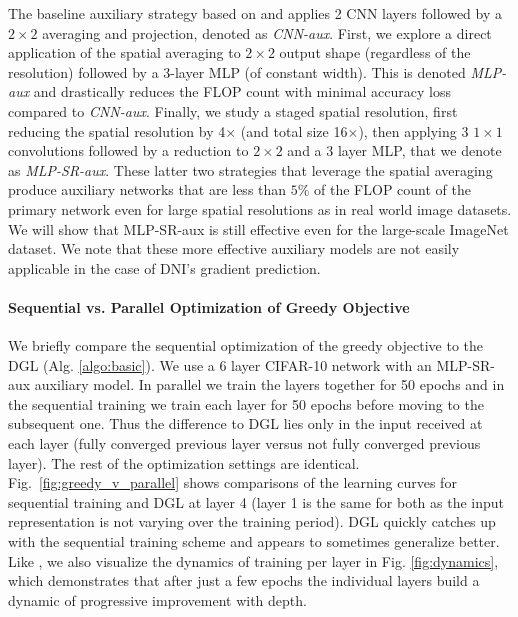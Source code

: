 \documentclass{article}
\begin{document}
The baseline auxiliary strategy based on  \citep{shallow} and \citep{jaderberg2016decoupled} applies 2 CNN layers followed by a $2\times 2$ averaging and projection, denoted as \textit{CNN-aux}. 
First, we explore  a direct application of the spatial averaging to $2\times2$ output shape (regardless of the  resolution) followed by a 3-layer MLP (of constant width). This is denoted \textit{MLP-aux} and drastically reduces the FLOP count with minimal accuracy loss compared to \textit{CNN-aux}. Finally, we study a staged spatial resolution, first reducing the spatial resolution by 4$\times$ (and total size 16$\times$), then applying 3 $1\times 1$ convolutions followed by a reduction to $2\times 2$ and a 3 layer MLP, that we denote as \textit{MLP-SR-aux}. These latter two strategies that leverage the spatial averaging produce auxiliary networks that are less than $5\%$ of the FLOP count of the primary network even for large spatial resolutions as in real world image datasets. We will show that MLP-SR-aux is still effective even for the large-scale ImageNet dataset. We note that these more effective auxiliary models are not easily applicable in the case of DNI's gradient prediction. \paragraph{ Sequential vs. Parallel Optimization of Greedy Objective}
We briefly compare the sequential optimization of the greedy objective \citep{shallow,bengio2007greedy} to the DGL (Alg.  \ref{algo:basic}). We use a 6 layer CIFAR-10 network with an MLP-SR-aux auxiliary model. In parallel we train the layers together for 50 epochs and in the sequential training we train each layer for 50 epochs before moving to the subsequent one. Thus the difference to DGL lies only in the input received at each layer (fully converged previous layer versus not fully converged previous layer). The rest of the optimization settings are identical. Fig.~\ref{fig:greedy_v_parallel} shows comparisons of the learning curves for sequential training and DGL at layer 4 (layer 1 is the same for both as the input representation is not varying over the training period).  DGL quickly catches up with the sequential training scheme and appears to sometimes generalize better. Like \citet{oyallon2017building}, we also visualize the dynamics of training per layer in Fig.  \ref{fig:dynamics}, which demonstrates that after just a few epochs the individual layers build a dynamic of progressive improvement with depth. %
\end{document}
